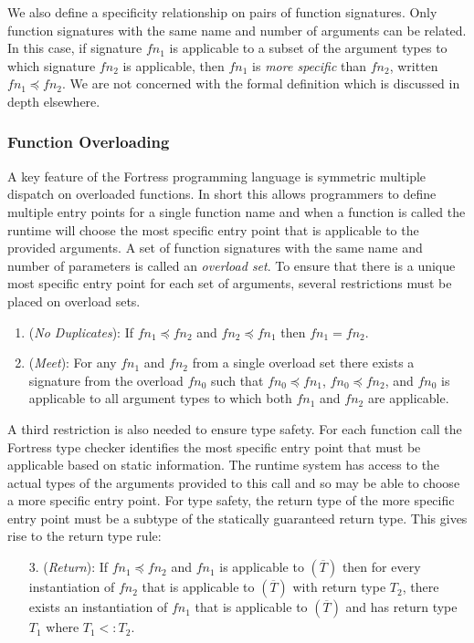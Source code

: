 \documentclass[preprint]{sigplanconf}
\begin{document}
We also define a specificity relationship on pairs of function signatures.  Only function signatures with the same
name and number of arguments can be related.  In this case, if signature $fn_1$ is applicable to a subset of the 
argument types to which signature $fn_2$ is applicable, then $fn_1$ is {\it more specific} than $fn_2$, written $fn_1 \preceq fn_2$.  We are not
concerned with the formal definition which is discussed in depth elsewhere.

\subsubsection{Function Overloading}

A key feature of the Fortress programming language is symmetric multiple dispatch on overloaded functions.
In short this allows programmers to define multiple entry points for a single function name and when a function
is called the runtime will choose the most specific entry point that is applicable to the provided arguments.  
A set of function signatures with the same name and number of parameters is called an {\it overload set}.
To ensure that there is a unique most specific entry point for each set of arguments, several restrictions must 
be placed on overload sets.

\begin{enumerate}
\item ({\it No Duplicates}): If $fn_1 \preceq fn_2$ and $fn_2 \preceq fn_1$ then $fn_1 = fn_2$.
\item ({\it Meet}): For any $fn_1$ and $fn_2$ from a single overload set there exists a signature from the overload $fn_0$ such 
	that $fn_0 \preceq fn_1$, $fn_0 \preceq fn_2$, and $fn_0$ is applicable to all
	argument types to which both $fn_1$ and $fn_2$ are applicable.
\end{enumerate}

A third restriction is also needed to ensure type safety.  For each function call the Fortress type checker identifies the most
specific entry point that must be applicable based on static information.  The runtime system has access to the actual types
of the arguments provided to this call and so may be able to choose a more specific entry point.  For type safety, the return
type of the more specific entry point must be a subtype of the statically guaranteed return type.  This gives rise to the
return type rule:

\begin{enumerate}
\item [3.] ({\it Return}): If $fn_1 \preceq fn_2$ and $fn_1$ is applicable to $(\overline{T})$ then for every instantiation
	of $fn_2$ that is applicable to $(\overline{T})$ with return type $T_2$, there exists an instantiation of
	$fn_1$ that is applicable to $(\overline{T})$ and has return type $T_1$ where $T_1 <: T_2$.
\end{enumerate}
\end{document}
